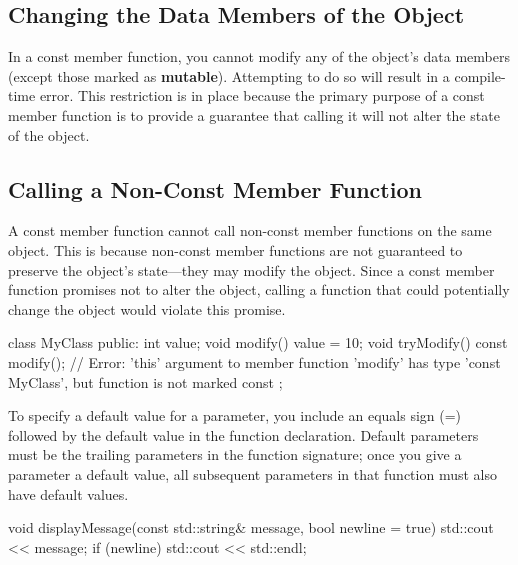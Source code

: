 \documentclass{report}
\begin{document}
    \subsection{Changing the Data Members of the Object}
    \bigbreak \noindent 
    In a const member function, you cannot modify any of the object's data members (except those marked as \textbf{mutable}). Attempting to do so will result in a compile-time error. This restriction is in place because the primary purpose of a const member function is to provide a guarantee that calling it will not alter the state of the object.
    \bigbreak \noindent 
    \subsection{Calling a Non-Const Member Function}
    \bigbreak \noindent 
    A const member function cannot call non-const member functions on the same object. This is because non-const member functions are not guaranteed to preserve the object's state—they may modify the object. Since a const member function promises not to alter the object, calling a function that could potentially change the object would violate this promise.
    \bigbreak \noindent 
    \begin{cppcode}
        class MyClass {
            public:
            int value;
            void modify() {
                value = 10;
            }
            void tryModify() const {
                modify(); // Error: 'this' argument to member function 'modify' has type 'const MyClass', but function is not marked const
            }
        };
    \end{cppcode}
    \bigbreak \noindent 

    \pagebreak 
    \bigbreak \noindent 
    To specify a default value for a parameter, you include an equals sign (=) followed by the default value in the function declaration. Default parameters must be the trailing parameters in the function signature; once you give a parameter a default value, all subsequent parameters in that function must also have default values.
    \bigbreak \noindent 
    \begin{cppcode}
        void displayMessage(const std::string& message, bool newline = true) {
            std::cout << message;
            if (newline) std::cout << std::endl;
        }
    \end{cppcode}
    \bigbreak \noindent 
\end{document}
